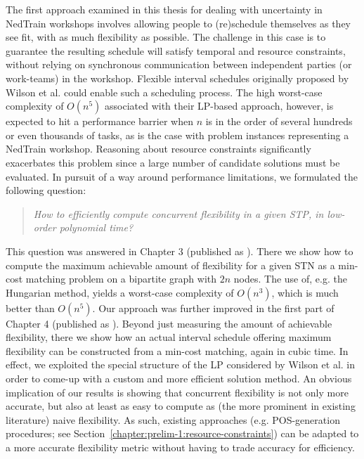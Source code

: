 	The first approach examined in this thesis for dealing with uncertainty in NedTrain workshops
	involves allowing people to (re)schedule themselves as they see fit, with as much flexibility as possible.
	The challenge in this case is to guarantee the resulting schedule will satisfy temporal and resource constraints,
	without relying on synchronous communication between independent parties (or work-teams) in the workshop. 
	Flexible interval schedules originally proposed by Wilson et al. \cite{wilson:2016} could enable such a scheduling process.
	The high worst-case complexity of $O(n^5)$ associated with their LP-based approach, however,
	is expected to hit a performance barrier when $n$ is in the order of several hundreds or even thousands of tasks,
	as is the case with problem instances representing a NedTrain workshop.
	Reasoning about resource constraints significantly exacerbates this problem since a large number of candidate solutions must be evaluated.
	In pursuit of a way around performance limitations, we formulated the following question:

	\begin{quote}
	\emph{How to efficiently compute concurrent flexibility in a given STP, in low-order polynomial time?}
	\end{quote}

	This question was answered in Chapter 3 (published as \cite{mountakis:2015}).
	There we show how to compute the maximum achievable amount of flexibility for a given STN
	as a min-cost matching problem on a bipartite graph with $2 n$ nodes.
	The use of, e.g. the Hungarian method, yields a worst-case complexity of $O(n^3)$, which is much better than $O(n^5)$.
	Our approach was further improved in the first part of Chapter 4 (published as \cite{mountakis2017dynamic}).
	Beyond just measuring the amount of achievable flexibility, there we show how an actual interval schedule offering maximum flexibility 
	can be constructed from a min-cost matching, again in cubic time.
	In effect, we exploited the special structure of the LP considered by Wilson et al. 
	in order to come-up with a custom and more efficient solution method.
	An obvious implication of our results is showing that concurrent flexibility is 
	not only more accurate, but also at least as easy to compute as (the more prominent in existing literature) naive flexibility.
	As such, existing approaches (e.g. POS-generation procedures; see Section~\ref{chapter:prelim-1:resource-constraints})
	can be adapted to a more accurate flexibility metric without having to trade accuracy for efficiency.

